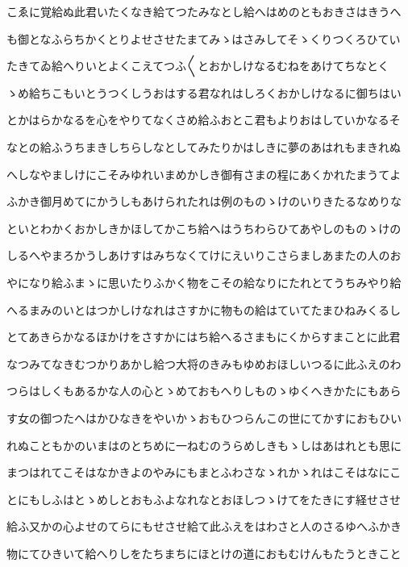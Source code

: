 \documentclass[a4paper,11pt,landscape]{ltjtarticle}
\begin{document}
こゑに覚給ぬ此君いたくなき給てつたみなとし給へはめのともおきさはきうへ
\par\medskip
も御となふらちかくとりよせさせたまてみゝはさみしてそゝくりつくろひてい
\par\medskip
たきてゐ給へりいとよくこえてつふ〱とおかしけなるむねをあけてちなとく
\par\medskip
ゝめ給ちこもいとうつくしうおはする君なれはしろくおかしけなるに御ちはい
\par\medskip
とかはらかなるを心をやりてなくさめ給ふおとこ君もよりおはしていかなるそ
\par\medskip
なとの給ふうちまきしちらしなとしてみたりかはしきに夢のあはれもまきれぬ
\par\medskip
へしなやましけにこそみゆれいまめかしき御有さまの程にあくかれたまうてよ
\par\medskip
ふかき御月めてにかうしもあけられたれは例のものゝけのいりきたるなめりな
\par\medskip
といとわかくおかしきかほしてかこち給へはうちわらひてあやしのものゝけの
\par\medskip
しるへやまろかうしあけすはみちなくてけにえいりこさらましあまたの人のお
\par\medskip
やになり給ふまゝに思いたりふかく物をこその給なりにたれとてうちみやり給
\par\medskip
へるまみのいとはつかしけなれはさすかに物もの給はていてたまひねみくるし
\par\medskip
とてあきらかなるほかけをさすかにはち給へるさまもにくからすまことに此君
\par\medskip
なつみてなきむつかりあかし給つ大将のきみもゆめおほしいつるに此ふえのわ
\par\medskip
つらはしくもあるかな人の心とゝめておもへりしものゝゆくへきかたにもあら
\par\medskip
す女の御つたへはかひなきをやいかゝおもひつらんこの世にてかすにおもひい
\par\medskip
れぬこともかのいまはのとちめに一ねむのうらめしきもゝしはあはれとも思に
\par\medskip
まつはれてこそはなかきよのやみにもまとふわさなゝれかゝれはこそはなにこ
\par\medskip
とにもしふはとゝめしとおもふよなれなとおほしつゝけてをたきにす経せさせ
\par\medskip
給ふ又かの心よせのてらにもせさせ給て此ふえをはわさと人のさるゆへふかき
\par\medskip
物にてひきいて給へりしをたちまちにほとけの道におもむけんもたうときこと
\par\medskip
\end{document}
